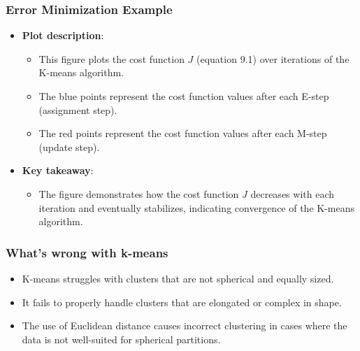 \subsubsection{Error Minimization Example}
\begin{example}
    \begin{itemize}
        \item \textbf{Plot description}:
        \begin{itemize}
            \item This figure plots the cost function \( J \) (equation 9.1) over iterations of the K-means algorithm.
            \item The blue points represent the cost function values after each E-step (assignment step).
            \item The red points represent the cost function values after each M-step (update step).
        \end{itemize}
        
        \item \textbf{Key takeaway}:
        \begin{itemize}
            \item The figure demonstrates how the cost function \( J \) decreases with each iteration and eventually stabilizes, indicating convergence of the K-means algorithm.
        \end{itemize}
    \end{itemize}
\end{example}

\subsubsection{What's wrong with k-means}
\begin{intuition}
    \begin{itemize}
        \item K-means struggles with clusters that are not spherical and equally sized.
        \item It fails to properly handle clusters that are elongated or complex in shape.
        \item The use of Euclidean distance causes incorrect clustering in cases where the data is not well-suited for spherical partitions.
    \end{itemize}    
\end{intuition}

